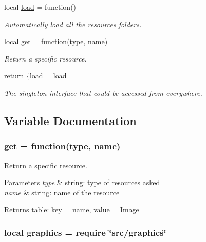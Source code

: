 \begin{DoxyCompactItemize}
local \hyperlink{resource_8lua_aea1dc50e03db80d1e2c31e4e1e8de983}{load} = function()
\begin{DoxyCompactList}\small\item\em Automatically load all the resources folders. \end{DoxyCompactList}\item 
local \hyperlink{resource_8lua_a9c57eef25270a48365249a68581a1247}{get} = function(type, name)
\begin{DoxyCompactList}\small\item\em Return a specific resource. \end{DoxyCompactList}\item 
\hyperlink{resource_8lua_a9717e7bbecb906637e86cef6da3d83c2}{return} \{\hyperlink{tilemap_8lua_a03ba94f58f782ea07eb3d96c8e60c69f}{load} = \hyperlink{tilemap_8lua_a03ba94f58f782ea07eb3d96c8e60c69f}{load}
\begin{DoxyCompactList}\small\item\em The singleton interface that could be accessed from everywhere. \end{DoxyCompactList}\end{DoxyCompactItemize}


\subsection{Variable Documentation}
\hypertarget{resource_8lua_a9c57eef25270a48365249a68581a1247}{
\subsubsection[{get}]{\setlength{\rightskip}{0pt plus 5cm}get = function(type, name)}}\label{resource_8lua_a9c57eef25270a48365249a68581a1247}


Return a specific resource. 


\begin{DoxyParams}{Parameters}
{\em type} & string\-: type of resources asked \\
\hline
{\em name} & string\-: name of the resource \\
\hline
\end{DoxyParams}
\begin{DoxyReturn}{Returns}
table\-: key = name, value = Image 
\end{DoxyReturn}
\hypertarget{resource_8lua_aae06ace8bee01f93d02dfaa4436de916}{
\subsubsection[{graphics}]{\setlength{\rightskip}{0pt plus 5cm}local graphics = require \char`\"{}src/graphics\char`\"{}}}\label{resource_8lua_aae06ace8bee01f93d02dfaa4436de916}


